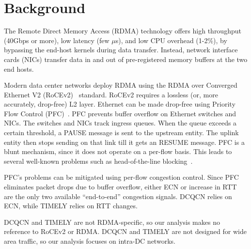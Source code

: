 \section{Background}
The Remote Direct Memory Access (RDMA) technology offers high throughput (40Gbps
or more), low latency (few $\mu$s), and low CPU overhead (1-2\%), by bypassing
the end-host kernels during data transfer. Instead, network interface cards
(NICs) transfer data in and out of pre-registered memory buffers at the two end
hosts.

Modern data center networks deploy RDMA using the RDMA over Converged Ethernet
V2 (RoCEv2)~\cite{rocev2} standard.  RoCEv2 requires a lossless (or, more
accurately, drop-free) L2 layer. Ethernet can be made drop-free using Priority
Flow Control (PFC)~\cite{pfc}. PFC prevents buffer overflow on Ethernet switches
and NICs. The switches and NICs track ingress queues. When the queue exceeds a
certain threshold, a PAUSE message is sent to the upstream entity. The uplink
entity then stops sending on that link till it gets an RESUME message.  PFC is a
blunt mechanism, since it does not operate on a per-flow basis. This leads to
several well-known problems such as head-of-the-line
blocking~\cite{dcqcn,tcp-bolt}. 

PFC's problems can be mitigated using per-flow congestion control. Since PFC
eliminates packet drops due to buffer overflow, either ECN or increase in RTT
are the only two available ``end-to-end'' congestion signals.  DCQCN relies on
ECN, while TIMELY relies on RTT changes.

DCQCN and TIMELY are not RDMA-specific, so our analysis makes no reference to RoCEv2
or RDMA. DCQCN and TIMELY are not designed for wide area traffic, so our
analysis focuses on intra-DC networks. 
